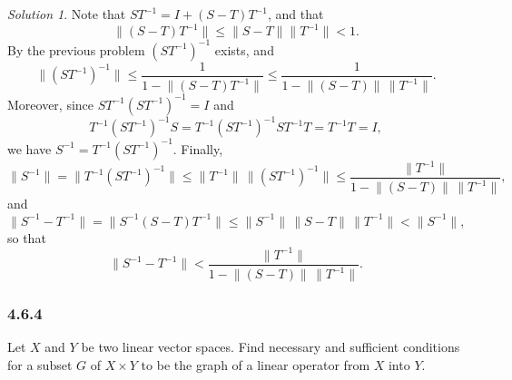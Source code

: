 \documentclass{report}
\newcommand{\norm}[1]{{\lVert #1 \rVert}}
\theoremstyle{remark}
\newtheorem*{solution}{Solution}
\begin{document}
\begin{solution}
  Note that $S T^{-1} = I + (S-T)T^{-1}$, and that
  \begin{equation*}
    \norm{(S-T)T^{-1}} \le \norm{S-T} \norm{T^{-1}} < 1.
  \end{equation*}
  By the previous problem $(ST^{-1})^{-1}$ exists, and
  \begin{equation*}
    \norm{(ST^{-1})^{-1}} \le \frac{1}{1 - \norm{(S-T)T^{-1}}} \le \frac{1}{1 - \norm{(S-T)} \, \norm{T^{-1}}}.
  \end{equation*}
  Moreover, since $ST^{-1}(ST^{-1})^{-1} = I$ and
  \begin{equation*}
    T^{-1}(ST^{-1})^{-1}S = T^{-1}(ST^{-1})^{-1}ST^{-1}T = T^{-1}T = I,
  \end{equation*}
  we have $S^{-1} = T^{-1}(ST^{-1})^{-1}$. Finally,
  \begin{equation*}
    \norm{S^{-1}} = \norm{T^{-1}(ST^{-1})^{-1}} \le \norm{T^{-1}} \, \norm{(ST^{-1})^{-1}} \le \frac{\norm{T^{-1}}}{1 - \norm{(S-T)} \, \norm{T^{-1}}},
  \end{equation*}
  and
  \begin{equation*}
    \norm{S^{-1} - T^{-1}} = \norm{S^{-1}(S - T)T^{-1}} \le \norm{S^{-1}} \, \norm{S-T} \, \norm{T^{-1}} < \norm{S^{-1}},
  \end{equation*}
  so that
  \begin{equation*}
    \norm{S^{-1} - T^{-1}} < \frac{\norm{T^{-1}}}{1 - \norm{(S-T)} \, \norm{T^{-1}}}.
  \end{equation*}
\end{solution}

\subsubsection*{4.6.4}
Let $X$ and $Y$ be two linear vector spaces. Find necessary and sufficient conditions for a subset $G$ of $X \times Y$ to be the graph of a linear operator from $X$ into $Y$.
\end{document}
